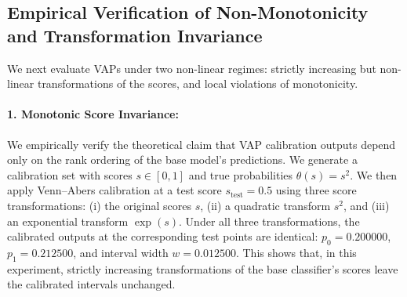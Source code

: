 \documentclass[11pt]{article}
\begin{document}
	\subsection{Empirical Verification of Non-Monotonicity and Transformation Invariance}
	\label{subsec:non_monotonic_results}
	
	We next evaluate VAPs under two non-linear regimes: strictly increasing but non-linear transformations of the scores, and local violations of monotonicity.
	
	\paragraph{1. Monotonic Score Invariance:}
	We empirically verify the theoretical claim that VAP calibration outputs depend only on the rank ordering of the base model's predictions. We generate a calibration set with scores $s \in [0, 1]$ and true probabilities $\theta(s) = s^2$. We then apply Venn--Abers calibration at a test score $s_{\text{test}} = 0.5$ using three score transformations: (i) the original scores $s$, (ii) a quadratic transform $s^2$, and (iii) an exponential transform $\exp(s)$. 
	Under all three transformations, the calibrated outputs at the corresponding test points are identical: $p_0 = 0.200000$, $p_1 = 0.212500$, and interval width $w = 0.012500$. This shows that, in this experiment, strictly increasing transformations of the base classifier's scores leave the calibrated intervals unchanged.
	
\end{document}
